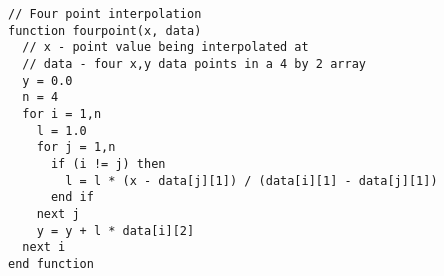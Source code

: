 \begin{lstlisting}[style=sPseudo,caption={Add two numbers function}]
// Four point interpolation
function fourpoint(x, data)
  // x - point value being interpolated at
  // data - four x,y data points in a 4 by 2 array
  y = 0.0
  n = 4
  for i = 1,n
    l = 1.0
    for j = 1,n
      if (i != j) then
        l = l * (x - data[j][1]) / (data[i][1] - data[j][1])
      end if
    next j
    y = y + l * data[i][2]
  next i
end function
\end{lstlisting}


